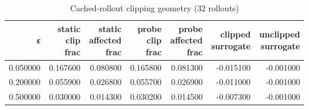 \begin{table}
\caption{Cached-rollout clipping geometry (32 rollouts)}
\label{tab:t2_ppo_cached_clipping}
\begin{tabular}{rrrrrrr}
\toprule
ε & static clip frac & static affected frac & probe clip frac & probe affected frac & clipped surrogate & unclipped surrogate \\
\midrule
0.050000 & 0.167600 & 0.080800 & 0.165800 & 0.081300 & -0.015100 & -0.001000 \\
0.200000 & 0.055900 & 0.026800 & 0.055700 & 0.026900 & -0.011000 & -0.001000 \\
0.500000 & 0.030000 & 0.014300 & 0.030200 & 0.014500 & -0.007300 & -0.001000 \\
\bottomrule
\end{tabular}
\end{table}
